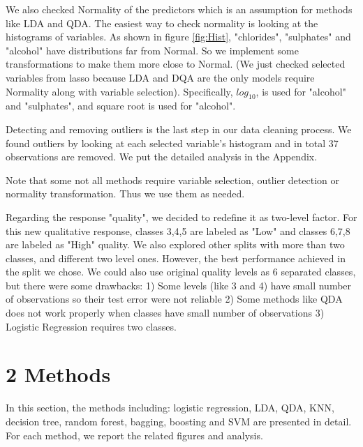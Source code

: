 \documentclass{article}
\begin{document}
We also checked Normality of the predictors which is an assumption for methods like LDA and QDA. The easiest way to check normality is looking at the histograms of variables. As shown in figure \eqref{fig:Hist}, "chlorides", "sulphates" and "alcohol" have distributions far from Normal. So we implement some transformations to make them more close to Normal. (We just checked selected variables from lasso because LDA and DQA are the only models require Normality along with variable selection). Specifically, $log_{10}$, is used for "alcohol" and "sulphates", and square root is used for "alcohol".

Detecting and removing outliers is the last  step in our data cleaning process. We found outliers by looking at each selected variable's histogram and in total 37 observations are removed. We put the detailed analysis in the Appendix.

Note that some not all methods require variable selection, outlier detection or normality transformation. Thus we use them as needed. 

Regarding the response "quality", we decided to redefine it as two-level factor. For this new qualitative response, classes 3,4,5 are labeled as "Low" and classes 6,7,8 are labeled as "High" quality. We also explored other splits with more than two classes, and different two level ones. However, the best performance achieved in the split we chose. We could also use original quality levels as 6 separated classes, but there were some drawbacks: 1) Some levels (like 3 and 4) have small number of observations so their test error were not reliable 2) Some methods like QDA does not work properly when classes have small number of observations 3) Logistic Regression requires two classes. 
\section{2  Methods}
In this section, the methods including: logistic regression, LDA, QDA, KNN, decision tree, random forest, bagging, boosting and SVM are presented in detail. For each method, we report the related figures and analysis.
\end{document}
